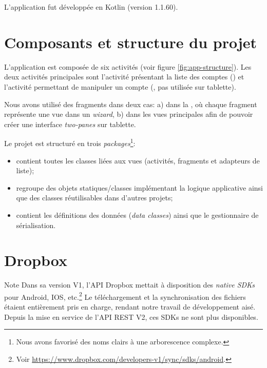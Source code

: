 
L'application \easypass{} fut développée en Kotlin (version 1.1.60).


\section{Composants et structure du projet}

L'application est composée de six activités (voir figure \ref{fig:app-structure}). Les deux activités principales sont l'activité présentant la liste des comptes () et l'activité permettant de manipuler un compte (, pas utilisée sur tablette). 

Nous avons utilisé des fragments dans deux cas: a) dans la , où chaque fragment représente une vue dans un \emph{wizard}, b) dans les vues principales afin de pouvoir créer une interface \emph{two-panes} sur tablette.


Le projet est structuré en trois \emph{packages}\footnote{Nous avons favorisé des noms clairs à une arborescence complexe.}:

\begin{itemize}
\item {} contient toutes les classes liées aux vues (activités, fragments et adapteurs de liste);
\item {} regroupe des objets statiques/classes implémentant la logique applicative ainsi que des classes réutilisables dans d'autres projets;
\item {} contient les définitions des données (\emph{data classes}) ainsi que le gestionnaire de sérialisation.
\end{itemize}

\section{Dropbox}

\begin{notepar}{Note}
Dans sa version V1, l'API Dropbox mettait à disposition des \emph{native SDKs} pour Android, IOS, etc.\footnote{Voir \url{https://www.dropbox.com/developers-v1/sync/sdks/android}.} Le téléchargement et la synchronisation des fichiers étaient entièrement pris en charge, rendant notre travail de développement aisé. Depuis la mise en service de l'API REST V2, ces SDKs ne sont plus disponibles.
\end{notepar}

